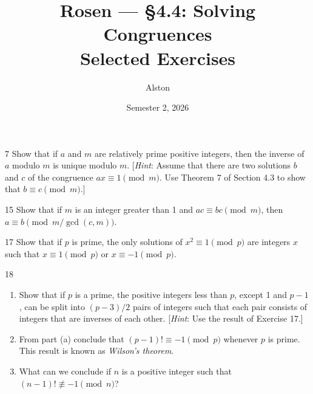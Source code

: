 \documentclass[11pt]{article}
\title{Rosen --- \S 4.4: Solving Congruences\\ \large Selected Exercises}
\author{Alston}
\date{Semester 2, 2026}
\begin{document}
\maketitle

\begin{exercise}{7}
    Show that if $a$ and $m$ are relatively prime positive integers,
    then the inverse of $a$ modulo $m$ is unique modulo $m$.
    [\emph{Hint}: Assume that there are two solutions $b$ and $c$ of
    the congruence $ax \equiv 1 \pmod{m}$. Use Theorem 7 of Section
    4.3 to show that $b \equiv c \pmod{m}$.]
\end{exercise}

\begin{exercise}{15}
    Show that if $m$ is an integer greater than 1 and
    $ac \equiv bc \pmod{m}$, then
    $a \equiv b \pmod{m/\gcd(c,m)}$.
\end{exercise}

\begin{exercise}{17}
    Show that if $p$ is prime, the only solutions of
    $x^2 \equiv 1 \pmod{p}$ are integers $x$ such that
    $x \equiv 1 \pmod{p}$ or $x \equiv -1 \pmod{p}$.
\end{exercise}

\begin{exercise}{18}
    \begin{enumerate}[label=(\alph*)]
        \item Show that if $p$ is a prime, the positive integers less
        than $p$, except 1 and $p-1$, can be split into $(p-3)/2$
        pairs of integers such that each pair consists of integers
        that are inverses of each other.
        [\emph{Hint}: Use the result of Exercise 17.]
        \item From part (a) conclude that $(p-1)! \equiv -1
        \pmod{p}$ whenever $p$ is prime. This result is known as
        \emph{Wilson's theorem}.
        \item What can we conclude if $n$ is a positive integer such
        that $(n-1)! \not\equiv -1 \pmod{n}$?
    \end{enumerate}
\end{exercise}
\end{document}
